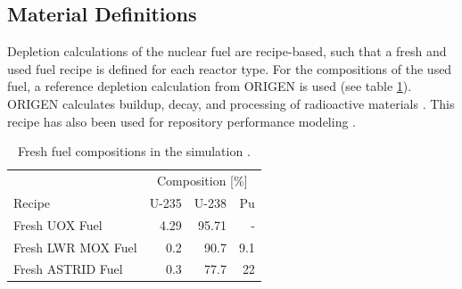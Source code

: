 \subsection{Material Definitions}
Depletion calculations of the nuclear fuel are recipe-based, such that a fresh 
and used fuel recipe is defined for each reactor type.
For the compositions of the used fuel, a reference depletion calculation
from ORIGEN is used (see table \ref{tab:comp_fresh}). ORIGEN calculates buildup,
 decay, and processing of radioactive materials
\cite{parks_overview_1992}. This recipe has also been used for repository performance modeling \cite{wilson_adoption_2009}.

\begin{table}[h]
    \centering
    \caption{Fresh fuel compositions in the simulation \cite{wilson_adoption_2009, varaine_pre-conceptual_2012}.}
        \begin{tabular}{lrrr}
            \hline
             & \multicolumn{3}{c}{ Composition [\%]} \\
            Recipe & U-235  & U-238  & Pu \\ 
            \hline
            Fresh \gls{UOX} Fuel & 4.29 & 95.71 & -   \\ 
            Fresh \gls{LWR} \gls{MOX} Fuel & 0.2 & 90.7 & 9.1 \\ 
            Fresh \gls{ASTRID} Fuel & 0.3 & 77.7 & 22 \\
            \hline
        \end{tabular}
        
        \label{tab:comp_fresh}
\end {table}

